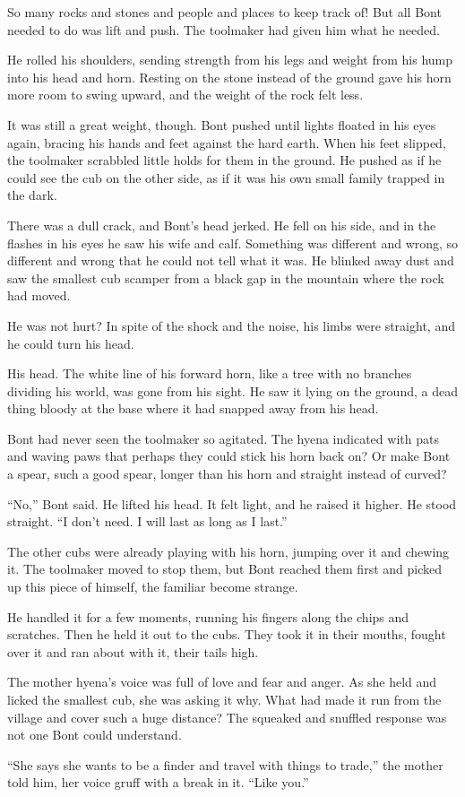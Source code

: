 So many rocks and stones and people and places to keep track of! But all Bont needed to do was lift and push. The toolmaker had given him what he needed.

He rolled his shoulders, sending strength from his legs and weight from his hump into his head and horn. Resting on the stone instead of the ground gave his horn more room to swing upward, and the weight of the rock felt less.

It was still a great weight, though. Bont pushed until lights floated in his eyes again, bracing his hands and feet against the hard earth. When his feet slipped, the toolmaker scrabbled little holds for them in the ground. He pushed as if he could see the cub on the other side, as if it was his own small family trapped in the dark.

There was a dull crack, and Bont's head jerked. He fell on his side, and in the flashes in his eyes he saw his wife and calf. Something was different and wrong, so different and wrong that he could not tell what it was. He blinked away dust and saw the smallest cub scamper from a black gap in the mountain where the rock had moved.

He was not hurt? In spite of the shock and the noise, his limbs were straight, and he could turn his head.

His head. The white line of his forward horn, like a tree with no branches dividing his world, was gone from his sight. He saw it lying on the ground, a dead thing bloody at the base where it had snapped away from his head.

Bont had never seen the toolmaker so agitated. The hyena indicated with pats and waving paws that perhaps they could stick his horn back on? Or make Bont a spear, such a good spear, longer than his horn and straight instead of curved?

``No,'' Bont said. He lifted his head. It felt light, and he raised it higher. He stood straight. ``I don't need. I will last as long as I last.''

The other cubs were already playing with his horn, jumping over it and chewing it. The toolmaker moved to stop them, but Bont reached them first and picked up this piece of himself, the familiar become strange.

He handled it for a few moments, running his fingers along the chips and scratches. Then he held it out to the cubs. They took it in their mouths, fought over it and ran about with it, their tails high.

The mother hyena's voice was full of love and fear and anger. As she held and licked the smallest cub, she was asking it why. What had made it run from the village and cover such a huge distance? The squeaked and snuffled response was not one Bont could understand.

``She says she wants to be a finder and travel with things to trade,'' the mother told him, her voice gruff with a break in it. ``Like you.''
